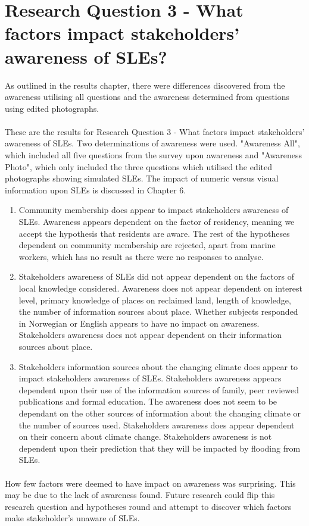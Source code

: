 \paragraph{}

\section{Research Question 3 - What factors impact stakeholders' awareness of SLEs? }
 As outlined in the results chapter, there were differences discovered from the awareness utilising all questions and the awareness determined from questions using edited photographs. 
\paragraph{}

These are the results for Research Question 3 - What factors impact stakeholders' awareness of SLEs. Two determinations of awareness were used. "Awareness All", which included all five questions from the survey upon awareness and "Awareness Photo", which only included the three questions which utilised the edited photographs showing simulated SLEs. The impact of numeric versus visual information upon SLEs is discussed in Chapter 6.
\begin{enumerate}
    \item Community membership does appear to impact stakeholders awareness of SLEs. Awareness appears dependent on the factor of residency, meaning we accept the hypothesis that residents are aware. The rest of the hypotheses dependent on community membership are rejected, apart from marine workers, which has no result as there were no responses to analyse.
  
    \item Stakeholders awareness of SLEs did not appear dependent on the factors of local knowledge considered. Awareness does not appear dependent on interest level, primary knowledge of places on reclaimed land, length of knowledge, the number of information sources about place. Whether subjects responded in Norwegian or English appears to have no impact on awareness. Stakeholders awareness does not appear dependent on their information sources about place. 

    \item  Stakeholders information sources about the changing climate does appear to impact stakeholders awareness of SLEs. Stakeholders awareness appears dependent upon their use of the information sources of family, peer reviewed publications and formal education. The awareness does not seem to be dependant on the other sources of information about the changing climate or the number of sources used. Stakeholders awareness does appear dependent on their concern about climate change. Stakeholders awareness is not dependent upon their prediction that they will be impacted by flooding from SLEs.
\end{enumerate}
\paragraph{}
How few factors were deemed to have impact on awareness was surprising. This may be due to the lack of awareness found.  Future research could flip this research question and hypotheses round and attempt to discover which factors make stakeholder's unaware of SLEs. 









